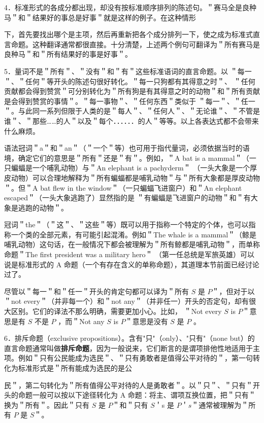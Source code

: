 4．标准形式的各成分都出现，却没有按标准顺序排列的陈述句。＂赛马全是良种马＂和＂结果好的事总是好事＂就是这样的例子。在这种情形

下，首先要找出哪个是主项，然后再重新把各个成分排列一下，使之成为标准式直言命题。这种翻译通常都很直接。十分清楚，上述两个例句可翻译为＂所有赛马是良种马＂和＂所有结果好的事是好事＂。

5．量词不是＂所有＂、＂没有＂和＂有＂这些标准语词的直言命题。以 ＂每一＂、＂任何＂等开头的陈述句很好转化。＂每一只狗都有其得意之时＂、 ＂任何贡献都会得到赞赏＂可分别转化为＂所有狗是有其得意之时的动物＂和＂所有贡献是会得到赞赏的事情＂。＂每一事物＂、＂任何东西＂类似于 ＂每一＂、＂任一＂。与此同一系列但限于人类的是＂每人＂、＂任何人＂、＂无论谁＂、＂不管是谁＂、＂那些……的人＂以及＂每个．．．．．．的人＂等等。以上各表达式都不会带来什么麻烦。

语法冠词＂a＂和＂an＂（＂一个＂等）也可用于指代量词，必须依据当时的语境，确定它们的意思是＂所有＂还是＂有＂。例如，＂A bat is a mammal＂（一只蝙蝠是一个哺乳动物）与＂An elephant is a pachyderm＂ （一头大象是一个厚皮动物）可以合理地解释为＂所有蝙蝠都是哺乳动物＂与＂所有大象都是厚皮动物＂。但＂A bat flew in the window＂（一只蝙蝠飞进窗户）和＂An elephant escaped＂（一头大象逃跑了）显然指的是 ＂有蝙蝠是飞进窗户的动物＂和＂有大象是逃跑的动物＂。

冠词＂the＂（＂这＂、＂这些＂等）既可以用于指称一个特定的个体，也可以指称一个类的全部元素，有可能引起混淆。例如＂The whale is a mammal＂（鲸是哺乳动物）这句话，在一般情况下都会被理解为＂所有鲸都是哺乳动物＂，而单称命题＂The first president was a military hero＂ （第一任总统是军旅英雄）可以说是标准形式的 A 命题（一个有存在含义的单称命题），其道理本节前面已经讨论过了。\cite{frege1892}

尽管以＂每一＂和＂任一＂开头的肯定句都可以译为＂所有 $S$ 是 $P$＂，但对于以＂not every＂（并非每一个）和＂not any＂（并非任一）开头的否定句，却有很大区别。它们的译法不那么明确，需要更加小心。比如， ＂Not every $S$ is $P$＂意思是有 $S$ 不是 $P$ ，而＂Not any $S$ is $P$＂意思是没有 $S$ 是 $P$ 。

6．排斥命题（exclusive propositions）。含有"只"（only）、"只有"（none but）的直言命题通常叫做\textbf{排斥命题}，因为一般说来，它们断言的是谓项排他性地适用于主项。例如＂只有公民能成为选民＂、＂只有勇敢者是值得公平对待的＂，第一句转化为标准形式是＂所有能成为选民的是公

民＂，第二句转化为＂所有值得公平对待的人是勇敢者＂。以＂只＂、＂只有＂开头的命题一般可以按以下途径转化为 A 命题：将主、谓项互换位置，把＂只有＂换为＂所有＂。因此＂只有 $S$ 是 $P$＂和＂只有 $S$＇s 是 $P$＇$s$＂通常被理解为＂所有 $P$ 是 $S$＂。

